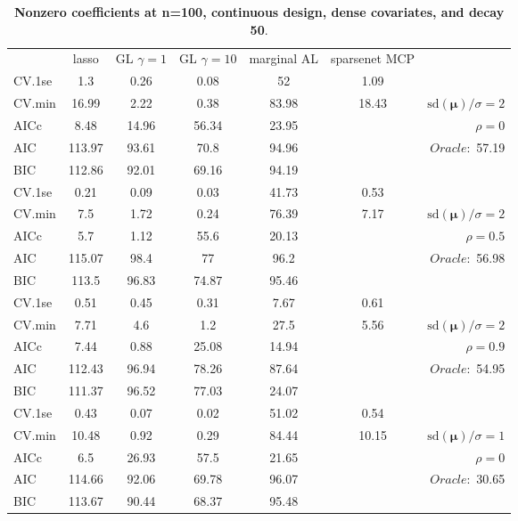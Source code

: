 \begin{table}\vspace{-.5cm}
\caption[l]{ { \bf Nonzero coefficients at n=100, continuous design, 
dense covariates, and  decay  50}.}
\vspace{-.5cm}
\footnotesize{}
\begin{center}
\begin{tabular}{l*{5}{c}|r}
& lasso & GL $\gamma=1$ & GL $\gamma=10$ & marginal AL & sparsenet MCP  & \\
 \cline{1-7}
CV.1se & 1.3 & 0.26 & 0.08 & 52 & 1.09 & \\
CV.min & 16.99 & 2.22 & 0.38 & 83.98 & 18.43 &  $\mathrm{sd}(\mathbf{\mu})/\sigma=2$ \\
AICc & 8.48 & 14.96 & 56.34 & 23.95 & & $\rho=0$ \\
AIC & 113.97 & 93.61 & 70.8 & 94.96 & &  \multirow{2}{*}{$Oracle: $ 57.19} \\
BIC & 112.86 & 92.01 & 69.16 & 94.19 & &  \\
 \hline 
CV.1se & 0.21 & 0.09 & 0.03 & 41.73 & 0.53 & \\
CV.min & 7.5 & 1.72 & 0.24 & 76.39 & 7.17 &  $\mathrm{sd}(\mathbf{\mu})/\sigma=2$ \\
AICc & 5.7 & 1.12 & 55.6 & 20.13 & & $\rho=0.5$ \\
AIC & 115.07 & 98.4 & 77 & 96.2 & &  \multirow{2}{*}{$Oracle: $ 56.98} \\
BIC & 113.5 & 96.83 & 74.87 & 95.46 & &  \\
 \hline 
CV.1se & 0.51 & 0.45 & 0.31 & 7.67 & 0.61 & \\
CV.min & 7.71 & 4.6 & 1.2 & 27.5 & 5.56 &  $\mathrm{sd}(\mathbf{\mu})/\sigma=2$ \\
AICc & 7.44 & 0.88 & 25.08 & 14.94 & & $\rho=0.9$ \\
AIC & 112.43 & 96.94 & 78.26 & 87.64 & &  \multirow{2}{*}{$Oracle: $ 54.95} \\
BIC & 111.37 & 96.52 & 77.03 & 24.07 & &  \\
 \hline 
CV.1se & 0.43 & 0.07 & 0.02 & 51.02 & 0.54 & \\
CV.min & 10.48 & 0.92 & 0.29 & 84.44 & 10.15 &  $\mathrm{sd}(\mathbf{\mu})/\sigma=1$ \\
AICc & 6.5 & 26.93 & 57.5 & 21.65 & & $\rho=0$ \\
AIC & 114.66 & 92.06 & 69.78 & 96.07 & &  \multirow{2}{*}{$Oracle: $ 30.65} \\
BIC & 113.67 & 90.44 & 68.37 & 95.48 & &  \\

\end{tabular}
\end{center}
\end{table}
